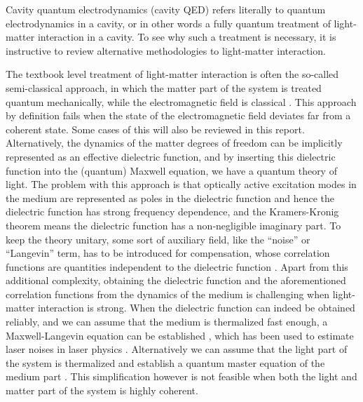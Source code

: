 \documentclass[hyperref, a4paper]{article}
\begin{document}
Cavity quantum electrodynamics (cavity QED) refers literally to 
quantum electrodynamics in a cavity,
or in other words a fully quantum treatment of light-matter interaction in a cavity.
To see why such a treatment is necessary,
it is instructive to review alternative methodologies to light-matter interaction.

The textbook level treatment of light-matter interaction 
is often the so-called semi-classical approach,
in which the matter part of the system is treated quantum mechanically,
while the electromagnetic field is classical \cite{scully1997quantum}.
This approach by definition fails when the state of the electromagnetic field 
deviates far from a coherent state.
Some cases of this will also be reviewed in this report.
Alternatively, the dynamics of the matter degrees of freedom can be implicitly 
represented as an effective dielectric function,
and by inserting this dielectric function into the (quantum) Maxwell equation,
we have a quantum theory of light.
The problem with this approach is that optically active excitation modes in the medium 
are represented as poles in the dielectric function and 
hence the dielectric function has strong frequency dependence,
and the Kramers-Kronig theorem means the dielectric function has a non-negligible imaginary part.
To keep the theory unitary,
some sort of auxiliary field, like the ``noise'' or ``Langevin'' term, 
has to be introduced for compensation,
whose correlation functions are quantities independent to the dielectric function
\cite{huttner1992quantization,knoll2000qed,philbin2010canonical}. 
Apart from this additional complexity,
obtaining the dielectric function and the aforementioned correlation functions 
from the dynamics of the medium
is challenging when light-matter interaction is strong.
When the dielectric function can indeed be obtained reliably,
and we can assume that the medium is thermalized fast enough,
a Maxwell-Langevin equation can be established
\cite{henry1986theory,henry1986phase,amooghorban2013quantum},
which has been used to estimate laser noises in laser physics
\cite{henry1986theory,henry1986phase}.
Alternatively we can assume that the light part of the system is thermalized
and establish a quantum master equation of the medium part
\cite{scully1997quantum}.
This simplification however is not feasible when 
both the light and matter part of the system is highly coherent.
\end{document}
